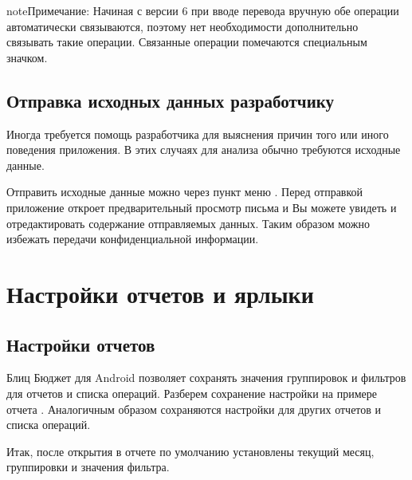 \documentclass[a4paper,10pt,russian]{sphinxmanual}
\begin{document}
\noindent{}

\begin{sphinxadmonition}{note}{Примечание:}
Начиная с версии 6 при вводе перевода вручную обе операции автоматически связываются, поэтому нет
необходимости дополнительно связывать такие операции. Связанные операции помечаются специальным значком.
\end{sphinxadmonition}


\section{Отправка исходных данных разработчику}
\label{\detokenize{bulk-actions:id8}}
Иногда требуется помощь разработчика для выяснения причин того или иного поведения приложения. В этих
случаях для анализа обычно требуются исходные данные.

Отправить исходные данные можно через пункт меню . Перед отправкой
приложение откроет предварительный просмотр письма и Вы можете увидеть и отредактировать содержание
отправляемых данных. Таким образом можно избежать передачи конфиденциальной информации.

\noindent{}

\noindent{}


\chapter{Настройки отчетов и ярлыки}
\label{\detokenize{shortcuts:chapter-shortcuts}}\label{\detokenize{shortcuts:id1}}\label{\detokenize{shortcuts::doc}}

\section{Настройки отчетов}
\label{\detokenize{shortcuts:id2}}
Блиц Бюджет для Android позволяет сохранять значения группировок и фильтров для отчетов и списка операций. Разберем
сохранение настройки на примере отчета . Аналогичным образом сохраняются настройки
для других отчетов и списка операций.

Итак, после открытия в отчете по умолчанию установлены текущий месяц, группировки и значения фильтра.
\end{document}
